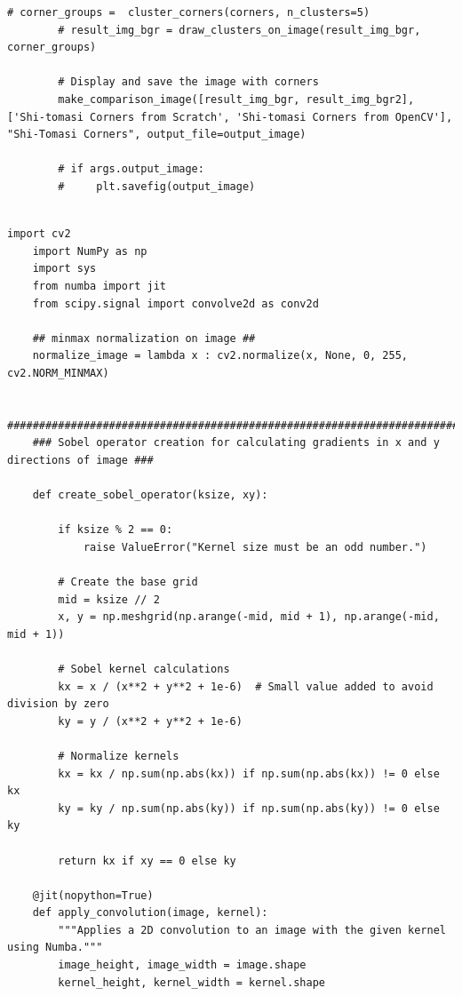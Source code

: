 \documentclass[11pt, conference, letterpaper]{IEEEtran}
\begin{document}
\begin{lstlisting}[style=python, caption={\texttt{shi\_tomasi\_corners.py}}, label={lst:stc}]
        # corner_groups =  cluster_corners(corners, n_clusters=5)
        # result_img_bgr = draw_clusters_on_image(result_img_bgr, corner_groups)
    
        # Display and save the image with corners
        make_comparison_image([result_img_bgr, result_img_bgr2], ['Shi-tomasi Corners from Scratch', 'Shi-tomasi Corners from OpenCV'], "Shi-Tomasi Corners", output_file=output_image)
        
        # if args.output_image:
        #     plt.savefig(output_image)
            
\end{lstlisting}

\begin{lstlisting}[style=python, caption={\texttt{image\_utils.py}}, label={lst:iutils}]
    import cv2
    import NumPy as np
    import sys
    from numba import jit
    from scipy.signal import convolve2d as conv2d
    
    ## minmax normalization on image ##
    normalize_image = lambda x : cv2.normalize(x, None, 0, 255, cv2.NORM_MINMAX)
    
    ##########################################################################################
    ### Sobel operator creation for calculating gradients in x and y directions of image ###
    
    def create_sobel_operator(ksize, xy):

        if ksize % 2 == 0:
            raise ValueError("Kernel size must be an odd number.")
        
        # Create the base grid
        mid = ksize // 2
        x, y = np.meshgrid(np.arange(-mid, mid + 1), np.arange(-mid, mid + 1))
        
        # Sobel kernel calculations
        kx = x / (x**2 + y**2 + 1e-6)  # Small value added to avoid division by zero
        ky = y / (x**2 + y**2 + 1e-6)
        
        # Normalize kernels
        kx = kx / np.sum(np.abs(kx)) if np.sum(np.abs(kx)) != 0 else kx
        ky = ky / np.sum(np.abs(ky)) if np.sum(np.abs(ky)) != 0 else ky
        
        return kx if xy == 0 else ky

    @jit(nopython=True)
    def apply_convolution(image, kernel):
        """Applies a 2D convolution to an image with the given kernel using Numba."""
        image_height, image_width = image.shape
        kernel_height, kernel_width = kernel.shape
        

\end{lstlisting}
\end{document}
